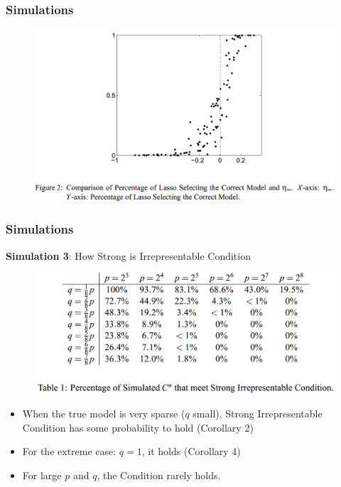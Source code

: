 \documentclass{beamer}
\begin{document}
	\begin{frame}
		\frametitle{Simulations}
		\begin{figure}
			\includegraphics[width=1\linewidth]{image017.png}
		\end{figure}
	\end{frame}
	
	\begin{frame}
		\frametitle{Simulations}
		\textbf{Simulation 3}: How Strong is Irrepresentable Condition\\
		\begin{figure}
			\includegraphics[width=.8\linewidth]{image018.png}
		\end{figure}
		\begin{itemize}
			\item 
			When the true model is very sparse ($q$ small), Strong Irrepresentable Condition has some probability to hold (Corollary 2)
			\item
			For the extreme case: $q=1$, it holds (Corollary 4)
			\item
			For large $p$ and $q$, the Condition rarely holds.
		\end{itemize}
	\end{frame}
	
	
\end{document}
